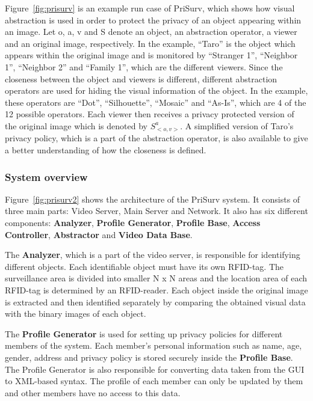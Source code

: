 \documentclass[conference, 11pt]{IEEEtran}
\begin{document}
Figure~\ref{fig:prisurv} is an example run case of PriSurv, which shows how visual abstraction is used in order to protect the privacy of an object appearing within an image. Let o, a, v and S denote an object, an abstraction operator, a viewer and an original image, respectively. In the example, “Taro” is the object which appears within the original image and is monitored by “Stranger 1”, “Neighbor 1”, “Neighbor 2” and “Family 1”, which are the different viewers. Since the closeness between the object and viewers is different, different abstraction operators are used for hiding the visual information of the object. In the example, these operators are “Dot”, “Silhouette”, “Mosaic” and “As-Is”, which are 4 of the 12 possible operators. Each viewer then receives a privacy protected version of the original image which is denoted by $S_{<o, v>}^a$. A simplified version of Taro’s privacy policy, which is a part of the abstraction operator, is also available to give a better understanding of how the closeness is defined. 

\subsubsection{System overview}

Figure~\ref{fig:prisurv2} shows the architecture of the PriSurv system. It consists of three main parts: Video Server, Main Server and Network. It also has six different components: \textbf{Analyzer}, \textbf{Profile Generator}, \textbf{Profile Base}, \textbf{Access Controller}, \textbf{Abstractor} and \textbf{Video Data Base}. 

The \textbf{Analyzer}, which is a part of the video server, is responsible for identifying different objects. Each identifiable object must have its own \ac{RFID}-tag. The surveillance area is divided into smaller N x N areas and the location area of each \ac{RFID}-tag is determined by an \ac{RFID}-reader. Each object inside the original image is extracted and then identified separately by comparing the obtained visual data with the binary images of each object. 

The \textbf{Profile Generator} is used for setting up privacy policies for different members of the system. Each member's personal information such as name, age, gender, address and privacy policy is stored securely inside the \textbf{Profile Base}. The Profile Generator is also responsible for converting data taken from the GUI to \ac{XML}-based syntax. The profile of each member can only be updated by them and other members have no access to this data. 
\end{document}
